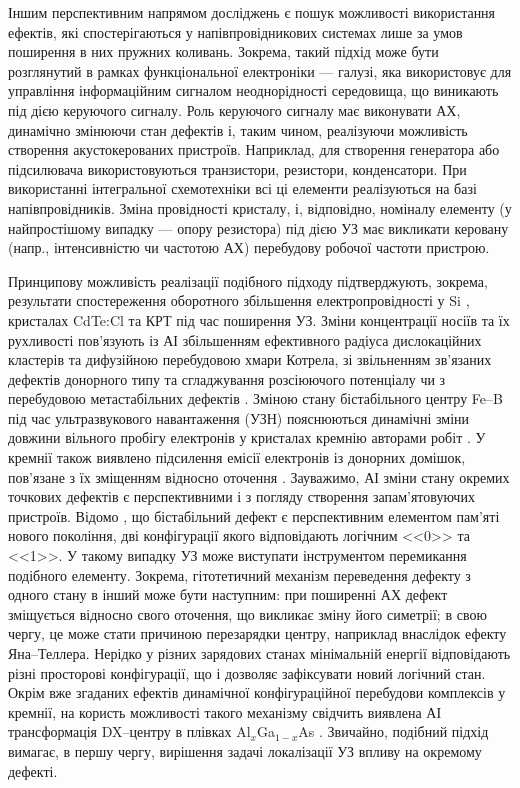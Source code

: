 Іншим перспективним напрямом досліджень є пошук можливості використання
ефектів, які спостерігаються у напівпровідникових системах
лише за умов поширення в них пружних коливань.
Зокрема, такий підхід може бути розглянутий в рамках функціональної електроніки --- галузі,
яка використовує для управління інформаційним сигналом неоднорідності середовища,  що виникають під дією керуючого сигналу.
Роль керуючого сигналу має виконувати АХ, динамічно змінюючи стан дефектів і, таким чином, реалізуючи можливість створення акустокерованих пристроїв.
Наприклад, для створення генератора або підсилювача використовуються транзистори, резистори, конденсатори.
При використанні інтегральної схемотехніки всі ці елементи реалізуються на базі напівпровідників.
Зміна провідності кристалу, і, відповідно, номіналу елементу (у найпростішому випадку --- опору резистора) під дією УЗ
має викликати керовану (напр., інтенсивністю чи частотою АХ) перебудову робочої частоти пристрою.

Принципову можливість реалізації подібного підходу підтверджують, зокрема, результати спостереження оборотного
збільшення електропровідності у Si \cite{YOlikhTPL2011r}, кристалах CdTe:Cl \cite{YOlikh:UFG2016,YOlikh:SupMicr} та КРТ \cite{OlikhYFTP99,OlikhYFTP2000} під час поширення УЗ.
Зміни концентрації носіїв та їх рухливості пов'язують із АІ
збільшенням ефективного радіуса дислокаційних кластерів та дифузійною перебудовою хмари Котрела\cite{YOlikh:UFG2016,YOlikh:SupMicr},
зі звільненням зв'язаних дефектів донорного типу та сгладжування розсіюючого потенціалу \cite{OlikhYFTP99,OlikhYFTP2000}
чи з перебудовою метастабільних дефектів \cite{YOlikhTPL2011r}.
Зміною стану бістабільного центру Fe--B під час ультразвукового навантаження (УЗН) пояснюються динамічні зміни довжини вільного пробігу електронів у кристалах кремнію авторами робіт \cite{Ostrovskii2001,OlikhFTT}.
У кремнії також виявлено підсилення емісії електронів із донорних домішок, пов'язане з їх зміщенням відносно оточення \cite{Korotchenkov1995}.
Зауважимо, АІ зміни стану окремих точкових дефектів є перспективними і з погляду створення запам'ятовуючих пристроїв.
Відомо \cite{MetaUFN}, що бістабільний дефект є перспективним елементом пам'яті нового покоління,
дві конфігурації якого відповідають логічним <<0>> та <<1>>.
У такому випадку УЗ може виступати інструментом перемикання подібного елементу.
Зокрема, гітотетичний механізм переведення дефекту з одного стану в інший може бути наступним:
при поширенні АХ дефект зміщується відносно свого оточення, що викликає зміну його симетрії;
в свою чергу, це може стати причиною перезарядки центру, наприклад внаслідок ефекту Яна--Теллера.
Нерідко у різних зарядових станах мінімальній енергії відповідають різні просторові конфігурації, що і дозволяє зафіксувати новий логічний стан.
Окрім вже згаданих ефектів динамічної конфігураційної перебудови комплексів у кремнії, на користь
можливості такого механізму свідчить виявлена АІ трансформація DX--центру в плівках Al$_x$Ga$_{1-x}$As \cite{belyaev1994}.
Звичайно, подібний підхід вимагає, в першу чергу, вирішення задачі локалізації УЗ впливу на окремому дефекті.

